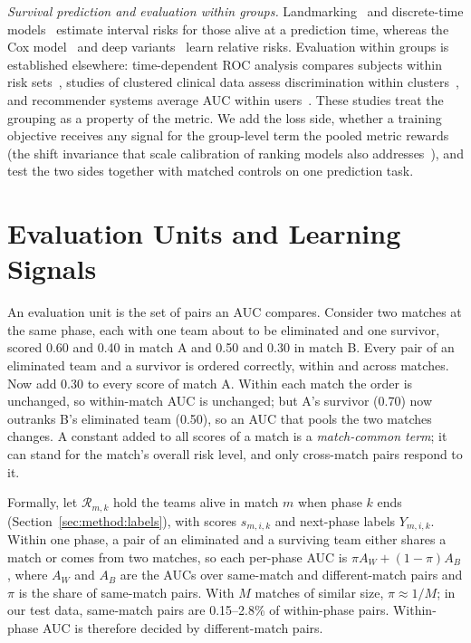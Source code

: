 \documentclass[sigconf,anonymous]{acmart}
\begin{document}
\emph{Survival prediction and evaluation within groups.} Landmarking~\cite{vanHouwelingen07} and discrete-time models~\cite{SingerWillett93,Gensheimer19} estimate interval risks for those alive at a prediction time, whereas the Cox model~\cite{Cox72} and deep variants~\cite{DeepHit18,DynamicDeepHit20} learn relative risks. Evaluation within groups is established elsewhere: time-dependent ROC analysis compares subjects within risk sets~\cite{HeagertyZheng05}, studies of clustered clinical data assess discrimination within clusters~\cite{vanKlaveren14}, and recommender systems average AUC within users~\cite{Zhou18}. These studies treat the grouping as a property of the metric. We add the loss side, whether a training objective receives any signal for the group-level term the pooled metric rewards (the shift invariance that scale calibration of ranking models also addresses~\cite{Yan22}), and test the two sides together with matched controls on one prediction task.

\section{Evaluation Units and Learning Signals}
\label{sec:account}
An evaluation unit is the set of pairs an AUC compares. Consider two matches at the same phase, each with one team about to be eliminated and one survivor, scored 0.60 and 0.40 in match A and 0.50 and 0.30 in match B. Every pair of an eliminated team and a survivor is ordered correctly, within and across matches. Now add 0.30 to every score of match A. Within each match the order is unchanged, so within-match AUC is unchanged; but A's survivor (0.70) now outranks B's eliminated team (0.50), so an AUC that pools the two matches changes. A constant added to all scores of a match is a \emph{match-common term}; it can stand for the match's overall risk level, and only cross-match pairs respond to it.

Formally, let $\mathcal{R}_{m,k}$ hold the teams alive in match $m$ when phase $k$ ends (Section~\ref{sec:method:labels}), with scores $s_{m,i,k}$ and next-phase labels $Y_{m,i,k}$. Within one phase, a pair of an eliminated and a surviving team either shares a match or comes from two matches, so each per-phase AUC is $\pi A_W+(1-\pi)A_B$, where $A_W$ and $A_B$ are the AUCs over same-match and different-match pairs and $\pi$ is the share of same-match pairs. With $M$ matches of similar size, $\pi\approx1/M$; in our test data, same-match pairs are 0.15--2.8\% of within-phase pairs. Within-phase AUC is therefore decided by different-match pairs.
\end{document}
